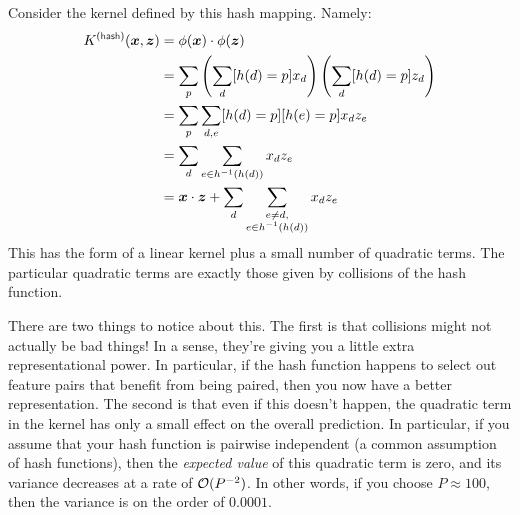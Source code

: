 Consider the kernel defined by this hash mapping.  Namely:
%
\begin{align}
  K\xth{hash}(\vx, \vz) 
  &=
  \dotp{\phi(\vx)}{\phi(\vz)} \\
  &=
  \sum_p \left( \sum_d [h(d) = p] x_d \right) \left( \sum_d [h(d) = p] z_d \right)\\
  &=
  \sum_p \sum_{d,e} [h(d) = p] [h(e) = p] x_d z_e \\
  &=
  \sum_d \sum_{e \in h\inv(h(d))} x_d z_e \\
  &=
  \dotp{\vx}{\vz} + \sum_d \sum_{\substack{e \neq d,\\e \in h\inv(h(d))}} x_d z_e
\end{align}
%
This  has the form of a linear kernel plus a
small number of quadratic terms.  The particular quadratic terms are
exactly those given by collisions of the hash function.

There are two things to notice about this.  The first is that
collisions might not actually be bad things!  In a sense, they're
giving you a little extra representational power.  In particular, if
the hash function happens to select out feature pairs that benefit
from being paired, then you now have a better representation.  The
second is that even if this doesn't happen, the quadratic term in the
kernel has only a small effect on the overall prediction.  In
particular, if you assume that your hash function is pairwise
independent (a common assumption of hash functions), then the
\emph{expected value} of this quadratic term is zero, and its variance
decreases at a rate of $\mathcal{O}(P^{-2})$.  In other words, if you choose
$P \approx 100$, then the variance is on the order of $0.0001$.


\begin{comment}
already know (sub)GD from loss.tex
talk about stochastic (sub)GD
formal optimization and duals
hashing tricks
sparsity
\end{comment}


